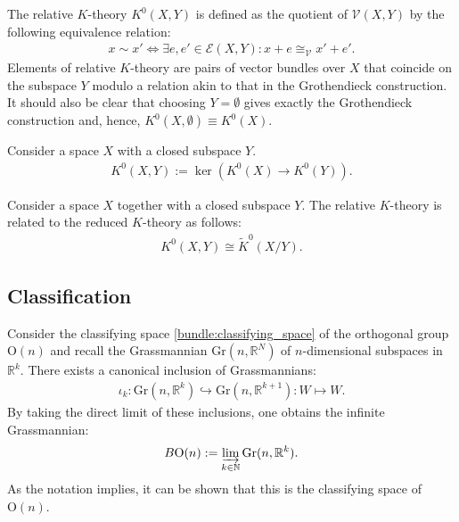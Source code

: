 {{        The relative $K$-theory $K^0(X,Y)$ is defined as the quotient of $\mathscr{V}(X,Y)$ by the following equivalence relation:
        \begin{gather}
            x\sim x' \iff \exists e,e'\in\mathscr{E}(X,Y):x+e\cong_\mathscr{V}x'+e'.
        \end{gather}
        Elements of relative $K$-theory are pairs of vector bundles over $X$ that coincide on the subspace $Y$ modulo a relation akin to that in the Grothendieck construction. It should also be clear that choosing $Y=\emptyset$ gives exactly the Grothendieck construction and, hence, $K^0(X,\emptyset)\equiv K^0(X)$.
    }
    \begin{adefinition}
        Consider a space $X$ with a closed subspace $Y$.
        \begin{gather}
            K^0(X,Y) := \ker\left(K^0(X)\rightarrow K^0(Y)\right).
        \end{gather}
    \end{adefinition}
    \begin{property}[Excision]\label{k:excision}
        Consider a space $X$ together with a closed subspace $Y$. The relative $K$-theory is related to the reduced $K$-theory as follows:
        \begin{gather}
            K^0(X,Y)\cong\widetilde{K}^0(X/Y).
        \end{gather}
    \end{property}

\subsection{Classification}

    \begin{property}
        Consider the classifying space \ref{bundle:classifying_space} of the orthogonal group $\mathrm{O}(n)$ and recall the Grassmannian $\mathrm{Gr}(n,\mathbb{R}^N)$ of $n$-dimensional subspaces in $\mathbb{R}^k$. There exists a canonical inclusion of Grassmannians:
        \begin{gather}
            \iota_k:\mathrm{Gr}(n,\mathbb{R}^k)\hookrightarrow\mathrm{Gr}(n,\mathbb{R}^{k+1}):W\mapsto W.
        \end{gather}
        By taking the direct limit of these inclusions, one obtains the infinite Grassmannian:
        \begin{gather}
            B\mathrm{O}(n) := \varinjlim_{k\in\mathbb{N}}\mathrm{Gr}(n,\mathbb{R}^k).
        \end{gather}
        As the notation implies, it can be shown that this is the classifying space of $\mathrm{O}(n)$.


\end{property}}
